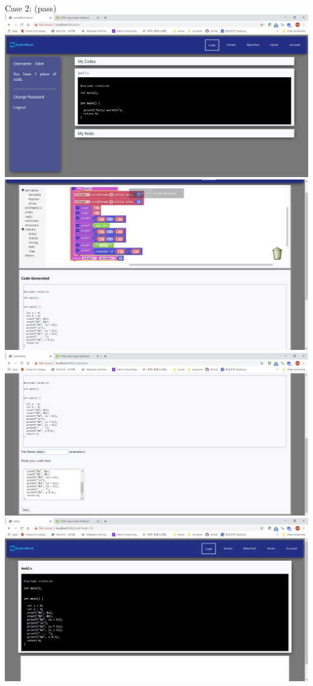 Case 2: (pass)\\
\includegraphics[scale=0.45]{Doc/Pics/case-6-1-2-1}\\
\includegraphics[scale=0.45]{Doc/Pics/case-6-1-2-2}\\
\includegraphics[scale=0.45]{Doc/Pics/case-6-1-2-3}\\
\includegraphics[scale=0.45]{Doc/Pics/case-6-1-2-4}\\
